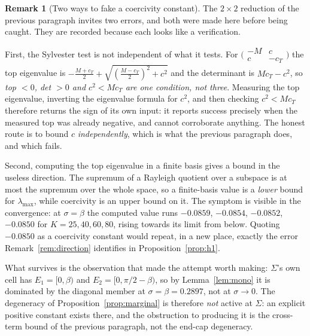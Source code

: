 \documentclass[11pt]{article}
\theoremstyle{definition}
\newtheorem{remark}[theorem]{Remark}
\newcommand{\Sig}{\Sigma}
\begin{document}
\begin{remark}[Two ways to fake a coercivity constant]\label{rem:fake}
The $2\times2$ reduction of the previous paragraph invites two errors, and both were made
here before being caught. They are recorded because each looks like a verification.

First, the Sylvester test is not independent of what it tests. For
$\bigl(\begin{smallmatrix}-M&c\\ c&-c_T\end{smallmatrix}\bigr)$ the top eigenvalue is
$-\tfrac{M+c_T}2+\sqrt{(\tfrac{M-c_T}2)^2+c^2}$ and the determinant is $Mc_T-c^2$, so
\emph{top $<0$, det $>0$ and $c^2<Mc_T$ are one condition, not three}. Measuring the top
eigenvalue, inverting the eigenvalue formula for $c^2$, and then checking $c^2<Mc_T$
therefore returns the sign of its own input: it reports success precisely when the measured
top was already negative, and cannot corroborate anything. The honest route is to bound
$c$ \emph{independently}, which is what the previous paragraph does, and which fails.

Second, computing the top eigenvalue in a finite basis gives a bound in the useless
direction. The supremum of a Rayleigh quotient over a subspace is at most the supremum over
the whole space, so a finite-basis value is a \emph{lower} bound for $\lambda_{\max}$, while
coercivity is an upper bound on it. The symptom is visible in the convergence: at
$\sigma=\beta$ the computed value runs $-0.0859$, $-0.0854$, $-0.0852$, $-0.0850$ for
$K=25,40,60,80$, rising towards its limit from below. Quoting $-0.0850$ as a coercivity
constant would repeat, in a new place, exactly the error Remark~\ref{rem:direction}
identifies in Proposition~\ref{prop:h1}.

What survives is the observation that made the attempt worth making: $\Sig$'s own cell has
$E_1=[0,\beta)$ and $E_2=[0,\pi/2-\beta)$, so by Lemma~\ref{lem:mono} it is dominated by the
diagonal member at $\sigma=\beta=0.2897$, not at $\sigma\to0$. The degeneracy of
Proposition~\ref{prop:marginal} is therefore \emph{not} active at $\Sig$: an explicit
positive constant exists there, and the obstruction to producing it is the cross-term bound
of the previous paragraph, not the end-cap degeneracy.
\end{remark}
\end{document}
